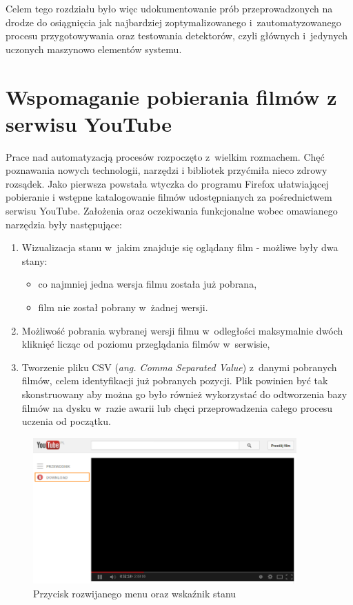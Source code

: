 Celem tego rozdziału było więc udokumentowanie prób przeprowadzonych
na drodze do osiągnięcia jak najbardziej zoptymalizowanego 
i~zautomatyzowanego procesu przygotowywania oraz testowania detektorów, 
czyli głównych i~jedynych uczonych maszynowo elementów systemu.

\section{Wspomaganie pobierania filmów z serwisu YouTube}

Prace nad automatyzacją procesów rozpoczęto z~wielkim rozmachem.
Chęć poznawania nowych technologii, narzędzi i bibliotek
przyćmiła nieco zdrowy rozsądek. Jako pierwsza powstała wtyczka
do programu Firefox ułatwiającej pobieranie i wstępne katalogowanie filmów
udostępnianych za pośrednictwem serwisu YouTube.
Założenia oraz oczekiwania funkcjonalne wobec omawianego narzędzia były 
następujące:

\begin{enumerate}
    \item Wizualizacja stanu w~jakim znajduje się oglądany film - 
        możliwe były dwa stany:
    \begin{itemize}
        \item co najmniej jedna wersja filmu została już pobrana,
        \item film nie został pobrany w~żadnej wersji.
    \end{itemize}
    \item Możliwość pobrania wybranej wersji filmu w~odległości maksymalnie
        dwóch kliknięć licząc od poziomu przeglądania filmów w~serwisie,
    \item Tworzenie pliku CSV (\textit{ang. Comma Separated Value})
        z~danymi pobranych filmów, celem identyfikacji już pobranych
        pozycji. Plik powinien być tak skonstruowany aby można go było
        również wykorzystać do odtworzenia bazy filmów na dysku w~razie
        awarii lub chęci przeprowadzenia całego procesu uczenia od
        początku.
\end{enumerate}

\begin{figure}[h!]
	\centering
	\includegraphics[width=0.9\textwidth]{img/env_yt_dwn_indicator}
	\caption{Przycisk rozwijanego menu oraz wskaźnik stanu}
	\label{fig:firefoxplugin1}
\end{figure}


